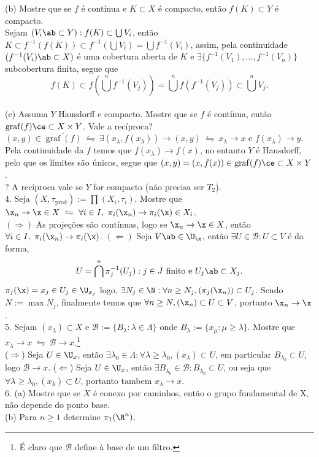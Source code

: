 (b) Mostre que se \(f\) é contínua e \(K\subset X\) é compacto, então \(f(K)\subset Y\) é compacto. \\ 
\textcolor{gris}{Sejam \((V_i\ab\subset Y): f(K) \subset \bigcup V_i\), então \(K \subset f^{-1}(f(K)) \subset f^{-1}\left(\bigcup V_i\right) = \bigcup f^{-1}(V_i) \), assim, pela continuidade \((f^{-1}(V_i)\ab \subset X)\) é uma cobertura aberta de \(K\) e \(\exists \{f^{-1}(V_1), \ldots, f^{-1}(V_n)\}\) subcobertura finita, segue que  
\[f(K) \subset f\left(\bigcup^n f^{-1}(V_j)\right) = \bigcup^n f(f^{-1}(V_j))\subset \bigcup^n V_j.\] }\\
(c) Assuma \(Y\) Hausdorff e compacto. Mostre que se \(f\) é contínua, então \(\operatorname{graf}(f)\ce \subset X\times Y\). Vale a recíproca? \\ 
\textcolor{gris}{
  \((x,y) \in \overline{\operatorname{graf}(f)}\ \leftrightharpoons \ \exists (x_\lambda, f(x_\lambda))\to  (x,y) \ \leftrightharpoons \ x_\lambda \to x\) e \(f(x_\lambda) \to y\). Pela continuidade da \(f\) temos que \(f(x_\lambda) \to f(x)\), no entanto \(Y\) é Hausdorff, pelo que os límites são únicos, segue que \((x,y) = (x,f(x)) \in \operatorname{graf}(f)\ce \subset X \times Y \). \\ 
  ? A recíproca vale se \(Y\) for compacto (não precisa ser \(T_2\)). 
} \\ 
4. Seja \((X, \tau_\text{prod}):= \prod (X_i,\tau_i)\). Mostre que \(\x_n\to \x \in X \ \leftrightharpoons \ \forall i \in I, \ \pi_i(\x_n) \to \pi_i(\x) \in X_i\).\\ 
\textcolor{gris}{
  \((\Rightarrow)\) As projeções são contínuas, logo se \(\x_n \to \x \in X \), então \(\forall i \in I, \ \pi_i(\x_n) \to \pi_i(\x)\). \((\Leftarrow)\) Seja \(V\ab \in \U_\x\), então \(\exists U \in \mathcal{B}: U\subset V \) é da forma,
  \[U = \bigcap^n \pi_j^{-1}(U_j) : j \in J \text{ finito e } U_j\ab\subset X_j.\]
  \(\pi_j(\x) = x_j \in U_j \in \U_{x_j}\) logo, \(\exists N_j \in \N : \forall n\geq N_j, (\pi_j(\x_n)) \subset U_j \). Sendo \(N:= \max {N_j}\), finalmente temos que \(\forall n\geq N, (\x_n)\subset U  \subset V \), portanto \(\x_n \to \x\).
} \\ 
5. Sejam \((x_\lambda) \subset X\) e \(\mathcal{B} := \{B_\lambda : \lambda \in \Lambda \}\) onde \(B_\lambda := \{x_\mu : \mu \geq \lambda\}\). Mostre que \(x_\lambda \to x \ \leftrightharpoons \ \mathcal{B} \to x\).\footnote{É claro que \(\mathcal{B}\) define à base de um filtro.} \\
\textcolor{gris}{(\(\Rightarrow\)) Seja \(U \in \U_x\), então \(\exists \lambda_0 \in \Lambda: \forall \lambda \geq \lambda_0, (x_\lambda) \subset U\), em particular \(B_{\lambda_0} \subset U\), logo \(\mathcal{B} \to x\). (\(\Leftarrow\)) Seja \(U \in \U_x\), então \(\exists B_{\lambda_0} \in \mathcal{B} : B_{\lambda_0} \subset U\), ou seja que \(\forall \lambda \geq \lambda_0, (x_\lambda) \subset U\), portanto tambem \(x_\lambda \to x\).   } \\ 
6. (a) Mostre que se \(X\) é conexo por caminhos, então o grupo fundamental de X, não depende do ponto base. \\ 
(b) Para \(n\geq 1\) determine \(\pi_1(\R^n)\). 
